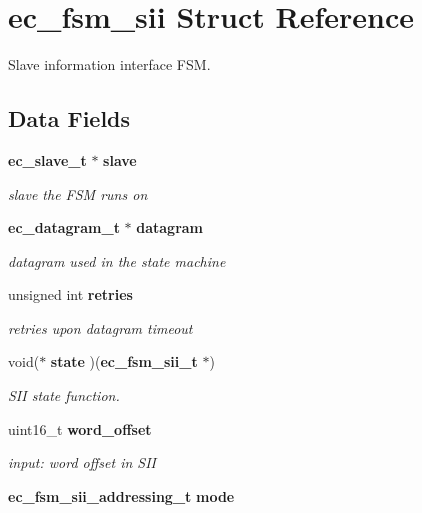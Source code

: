 \section{ec\-\_\-fsm\-\_\-sii Struct Reference}
\label{structec__fsm__sii}


Slave information interface F\-S\-M.  


\subsection*{Data Fields}
\begin{DoxyCompactItemize}
\item 
{\bf ec\-\_\-slave\-\_\-t} $\ast$ {\bf slave}\label{structec__fsm__sii_a8900a8deb8f7f8fa21b678bb45c49bd6}

\begin{DoxyCompactList}\small\item\em slave the F\-S\-M runs on \end{DoxyCompactList}\item 
{\bf ec\-\_\-datagram\-\_\-t} $\ast$ {\bf datagram}\label{structec__fsm__sii_a0b742789c074c3ebff83f0892571fd20}

\begin{DoxyCompactList}\small\item\em datagram used in the state machine \end{DoxyCompactList}\item 
unsigned int {\bf retries}\label{structec__fsm__sii_a1571b23ec01b79dc7287d327cc6a4812}

\begin{DoxyCompactList}\small\item\em retries upon datagram timeout \end{DoxyCompactList}\item 
void($\ast$ {\bf state} )({\bf ec\-\_\-fsm\-\_\-sii\-\_\-t} $\ast$)\label{structec__fsm__sii_a38d4274ecd8a9e1cd3135184a48fb218}

\begin{DoxyCompactList}\small\item\em S\-I\-I state function. \end{DoxyCompactList}\item 
uint16\-\_\-t {\bf word\-\_\-offset}\label{structec__fsm__sii_afecb19ccde2a49881d9430c65a854880}

\begin{DoxyCompactList}\small\item\em input\-: word offset in S\-I\-I \end{DoxyCompactList}\item 
{\bf ec\-\_\-fsm\-\_\-sii\-\_\-addressing\-\_\-t} {\bf mode}\label{structec__fsm__sii_abe104575bf34cbfb34beee82562524a7}


\end{DoxyCompactItemize}
